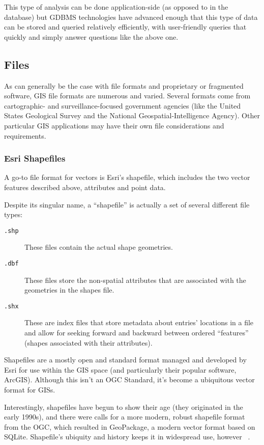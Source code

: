 This type of analysis can be done application-side (as opposed to in the database) but GDBMS technologies have advanced enough that this type of data can be stored and queried relatively efficiently, with user-friendly queries that quickly and simply answer questions like the above one.

\subsection{Files}
As can generally be the case with file formats and proprietary or fragmented software, GIS file formats are numerous and varied. Several formats come from cartographic- and surveillance-focused government agencies (like the United States Geological Survey and the National Geospatial-Intelligence Agency). Other particular GIS applications may have their own file considerations and requirements.

\subsubsection{Esri Shapefiles}
A go-to file format for vectors is Esri's shapefile, which includes the two vector features described above, attributes and point data.

Despite its singular name, a ``shapefile'' is actually a set of several different file types:

\begin{description}
  \item[\tt{.shp}] These files contain the actual shape geometries.
  \item[\tt{.dbf}] These files store the non-spatial attributes that are associated with the geometries in the shapes file.
  \item[\tt{.shx}] These are index files that store metadata about entries' locations in a file and allow for seeking forward and backward between ordered ``features'' (shapes associated with their attributes).
\end{description}

Shapefiles are a mostly open and standard format managed and developed by Esri for use within the GIS space (and particularly their popular software, ArcGIS). Although this isn't an OGC Standard, it's become a ubiquitous vector format for GISs.

Interestingly, shapefiles have begun to show their age (they originated in the early 1990s), and there were calls for a more modern, robust shapefile format from the OGC, which resulted in GeoPackage, a modern vector format based on SQLite. Shapefile's ubiquity and history keeps it in widespread use, however ~\cite{slashgeo,GeoPackage}.

